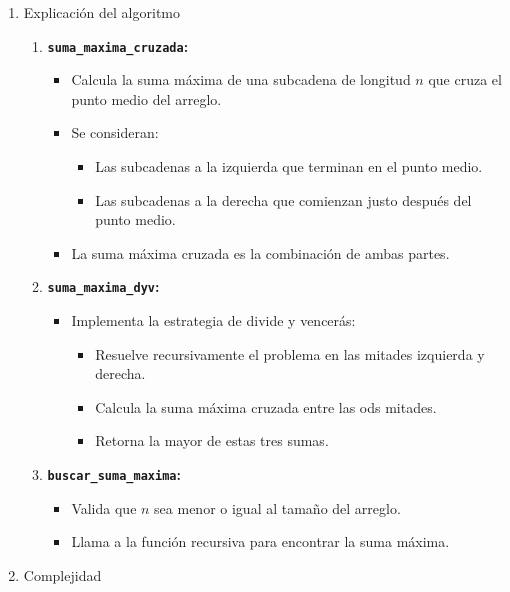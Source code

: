 \begin{enumerate}[label=\color{red}\textbf{\arabic*)}]
\begin{enumerate}[label=\arabic*)]
        

      \item Explicación del algoritmo
        \begin{enumerate}[label=\arabic*)]
          \item \textbf{\texttt{suma\_maxima\_cruzada}:}
            \begin{itemize}[label=\textbullet]
              \item Calcula la suma máxima de una subcadena de longitud $n$ que cruza el punto medio del arreglo.
              \item Se consideran:
                \begin{itemize}[label=\textbullet]
                  \item Las subcadenas a la izquierda que terminan en el punto medio.
                  \item Las subcadenas a la derecha que comienzan justo después del punto medio.
                \end{itemize}
              \item La suma máxima cruzada es la combinación de ambas partes.
            \end{itemize}
          \item \textbf{\texttt{suma\_maxima\_dyv}:}
            \begin{itemize}[label=\textbullet]
              \item Implementa la estrategia de divide y vencerás:
                \begin{itemize}[label=\textbullet]
                  \item  Resuelve recursivamente el problema en las mitades izquierda y derecha.
                  \item Calcula la suma máxima cruzada entre las ods mitades.
                  \item Retorna la mayor de estas tres sumas.
                \end{itemize}
            \end{itemize}
          \item \textbf{\texttt{buscar\_suma\_maxima}:}
            \begin{itemize}[label=\textbullet]
              \item Valida que $n$ sea menor o igual al tamaño del arreglo.
              \item Llama a la función recursiva para encontrar la suma máxima.
            \end{itemize}
        \end{enumerate}
      \item Complejidad


\end{enumerate}
\end{enumerate}
